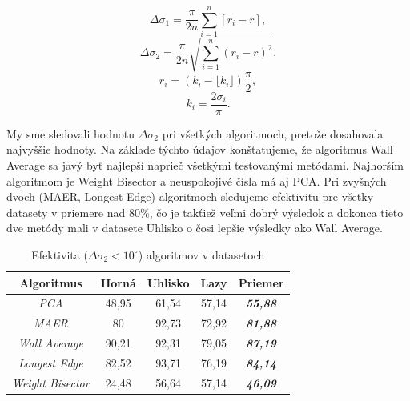 \documentclass[12pt]{article}
\begin{document}
$$ \Delta\sigma_{1} = \frac{\pi}{2n} \sum_{i=1}^{n}\left[ r_{i}-r \right], $$
$$ \Delta\sigma_{2} = \frac{\pi}{2n} \sqrt{\sum_{i=1}^{n} (r_{i}-r)^2}. $$$$$$
$$r_{i} = (k_{i} - \lfloor k_{i} \rfloor)\frac{\pi}{2},$$
$$k_{i} = \frac{2\sigma_{i}}{\pi}.$$
\par
My sme sledovali hodnotu $\Delta\sigma_{2}$ pri všetkých algoritmoch, pretože dosahovala najvyššie hodnoty. Na základe týchto údajov konštatujeme, že algoritmus Wall Average sa javý byť najlepší naprieč všetkými testovanými metódami. Najhorším algoritmom je Weight Bisector a neuspokojivé čísla má aj PCA. Pri zvyšných dvoch (MAER, Longest Edge) algoritmoch sledujeme efektivitu pre všetky datasety v priemere nad 80\%, čo je takťiež veľmi dobrý výsledok a dokonca tieto dve metódy mali v datasete Uhlisko o čosi lepšie výsledky ako Wall Average.
$$$$
\begin{table}[h]
    \centering
        \begin{tabular}{|c||c|c|c||c|}
          \hline
         \textbf{Algoritmus} & \textbf{Horná} & \textbf{Uhlisko} & \textbf{Lazy} & \textbf{Priemer} \\
         \hline
         \hline
         \textit{PCA} & 48,95  & 61,54 & 57,14 & \textbf{\textit{55,88}}\\
        \hline
        \textit{MAER}  & 80  & 92,73 & 72,92 & \textbf{\textit{81,88}}\\
        \hline
        \textit{Wall Average}  & 90,21 & 92,31 & 79,05& \textbf{\textit{87,19}} \\
        \hline
        \textit{Longest Edge}  & 82,52  & 93,71 & 76,19 & \textbf{\textit{84,14}}\\
        \hline 
       \textit{Weight Bisector} & 24,48  & 56,64 & 57,14& \textbf{\textit{46,09}} \\
        \hline
        \end{tabular}
    \caption{Efektivita ($\Delta\sigma_{2}<10^{\circ}$) algoritmov v datasetoch}
    \label{tab:my_label}
\end{table}{}
\newpage
\end{document}
